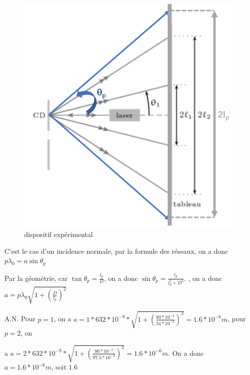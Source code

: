 \documentclass[a4paper,12pt]{book}
\begin{document}
\subsection{}
\begin{figure}[h]
    \begin{center}
    \includegraphics[scale=0.5]{tr122.png}
    \end{center}
    \caption{dispositif expérimental}
\end{figure}
C'est le cas d'un incidence normale, par la formule des réseaux, on a donc $p\lambda_0=a\sin\theta_p$

Par la géométrie, car $\tan \theta_p=\frac{l_p}{D}$, on a donc $\sin\theta_p=\frac{l_p}{l_p^2+D^2}$. 
, on a donc $\boxed{a=p\lambda_0\sqrt{1+\left(\frac{D}{l_p}\right)^2}}$

A.N. Pour $p=1$, on a $a=1*632*10^{-9}*\sqrt{1+\left(\frac{80*10^{-2}}{34*10^{-2}}\right)^2}=1.6*10^{-6}m$, 
pour $p=2$, on

\hspace*{\fill} 

a $a=2*632*10^{-9}*\sqrt{1+\left(\frac{80*10^{-2}}{97.5*10^{-2}}\right)^2}=1.6*10^{-6}m$. 
On a donc $\boxed{a=1.6*10^{-6}m}$, soit $1.6$ 

\hspace*{\fill} 
\end{document}

